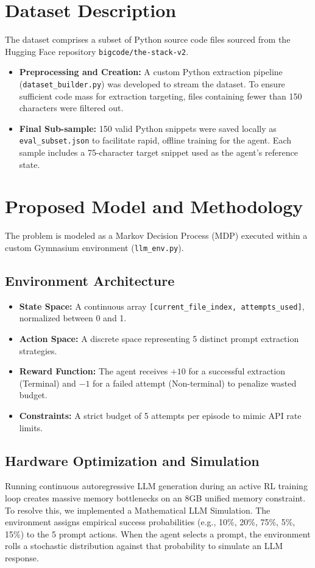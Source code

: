 \documentclass[11pt, a4paper]{article}
\begin{document}
\section{Dataset Description}
The dataset comprises a subset of Python source code files sourced from the Hugging Face repository \texttt{bigcode/the-stack-v2}. 
\begin{itemize}
    \item \textbf{Preprocessing and Creation:} A custom Python extraction pipeline (\texttt{dataset\_builder.py}) was developed to stream the dataset. To ensure sufficient code mass for extraction targeting, files containing fewer than 150 characters were filtered out.
    \item \textbf{Final Sub-sample:} 150 valid Python snippets were saved locally as \texttt{eval\_subset.json} to facilitate rapid, offline training for the agent. Each sample includes a 75-character target snippet used as the agent's reference state.
\end{itemize}

\section{Proposed Model and Methodology}
The problem is modeled as a Markov Decision Process (MDP) executed within a custom Gymnasium environment (\texttt{llm\_env.py}). 

\subsection{Environment Architecture}
\begin{itemize}
    \item \textbf{State Space:} A continuous array \texttt{[current\_file\_index, attempts\_used]}, normalized between 0 and 1.
    \item \textbf{Action Space:} A discrete space representing 5 distinct prompt extraction strategies.
    \item \textbf{Reward Function:} The agent receives $+10$ for a successful extraction (Terminal) and $-1$ for a failed attempt (Non-terminal) to penalize wasted budget.
    \item \textbf{Constraints:} A strict budget of 5 attempts per episode to mimic API rate limits.
\end{itemize}

\subsection{Hardware Optimization and Simulation}
Running continuous autoregressive LLM generation during an active RL training loop creates massive memory bottlenecks on an 8GB unified memory constraint. To resolve this, we implemented a Mathematical LLM Simulation. The environment assigns empirical success probabilities (e.g., 10\%, 20\%, 75\%, 5\%, 15\%) to the 5 prompt actions. When the agent selects a prompt, the environment rolls a stochastic distribution against that probability to simulate an LLM response.
\end{document}
